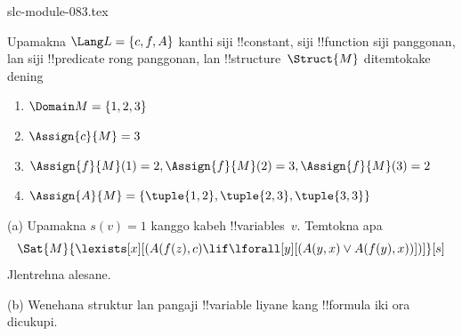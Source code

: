 \begin{filecontents*}[overwrite]{slc-module-083.tex}
\begin{prob}
Upamakna $\Lang L = \{c, f, A\}$ kanthi siji !!{constant}, siji
!!{function} siji panggonan, lan siji !!{predicate} rong panggonan,
lan !!{structure}~$\Struct{M}$ ditemtokake dening
\begin{enumerate}
\item $\Domain M = \{1, 2, 3\}$
\item $\Assign{c}{M} = 3$
\item $\Assign{f}{M}(1) = 2, \Assign{f}{M}(2) = 3, \Assign{f}{M}(3) = 2$
\item $\Assign{A}{M} = \{\tuple{1, 2}, \tuple{2, 3}, \tuple{3, 3}\}$
\end{enumerate}
(a) Upamakna $s(v) = 1$ kanggo kabeh !!{variable}s~$v$.
Temtokna apa
\[
\Sat{M}{\lexists[x][(A(f(z), c) \lif \lforall[y][(A(y, x) \lor A(f(y),
      x))])]}[s]
\]
Jlentrehna alesane.

(b) Wenehana struktur lan pangaji !!{variable} liyane kang
!!{formula} iki ora dicukupi.
\end{prob}


\end{filecontents*}

